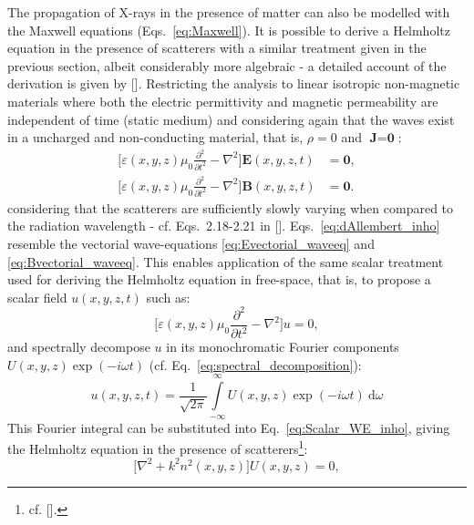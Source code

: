 \begin{refsection}
The propagation of X-rays in the presence of matter can also be modelled with the Maxwell equations (Eqs.~\ref{eq:Maxwell}). It is possible to derive a Helmholtz equation in the presence of scatterers with a similar treatment given in the previous section, albeit considerably more algebraic - a detailed account of the derivation is given by [\cite[\textit{§2.1}]{Paganin2006}]. Restricting the analysis to linear isotropic non-magnetic materials where both the electric permittivity and magnetic permeability are independent of time (static medium) and considering again that the waves exist in a uncharged and non-conducting material,  that is, $\rho=0$ and $\textbf{J}=\textbf{0}$:
\begin{subequations}\label{eq:dAllembert_inho}
    \begin{align}
        \Bigg[\varepsilon(x,y,z)\mu_0\frac{\partial^2}{\partial t^2} - \nabla^2 \Bigg]\textbf{E}(x,y,z,t) &= \textbf{0}, \\
        \Bigg[\varepsilon(x,y,z)\mu_0\frac{\partial^2}{\partial t^2} - \nabla^2 \Bigg]\textbf{B}(x,y,z,t) &=\textbf{0}.
    \end{align}
\end{subequations}{}
considering that the scatterers are sufficiently slowly varying when compared to the radiation wavelength - cf. Eqs.~2.18-2.21 in [\cite{Paganin2006}]. Eqs.~\ref{eq:dAllembert_inho} resemble the vectorial wave-equations \ref{eq:Evectorial_waveeq} and \ref{eq:Bvectorial_waveeq}. This enables application of the same scalar treatment used for deriving the Helmholtz equation in free-space, that is, to propose a scalar field $u(x,y,z,t)$ such as:
\begin{equation}\label{eq:Scalar_WE_inho}
    \Bigg[\varepsilon(x,y,z)\mu_0\frac{\partial^2}{\partial t^2} - \nabla^2\Bigg]u=0,
\end{equation}
and spectrally decompose $u$ in its monochromatic Fourier components $U(x,y,z)\exp{(-i\omega t)}$ (cf. Eq.~\ref{eq:spectral_decomposition}):
\begin{equation*}
    u(x,y,z,t)=\frac{1}{\sqrt{2\pi}}\int\limits_{-\infty}^\infty{U(x,y,z)\exp{(-i\omega t)}~\mathrm{d}\omega}
\end{equation*}
This Fourier integral can be substituted into Eq.~\ref{eq:Scalar_WE_inho}, giving the Helmholtz equation in the presence of scatterers\footnote{cf. [\cite[\textit{Eq.~2.28}]{Paganin2006}].}:
\begin{equation}\label{eq:Helmholtz_inho}
    \big[\nabla^2 + k^2n^2(x,y,z)\big]U(x,y,z) = 0,
\end{equation}{}

\end{refsection}
